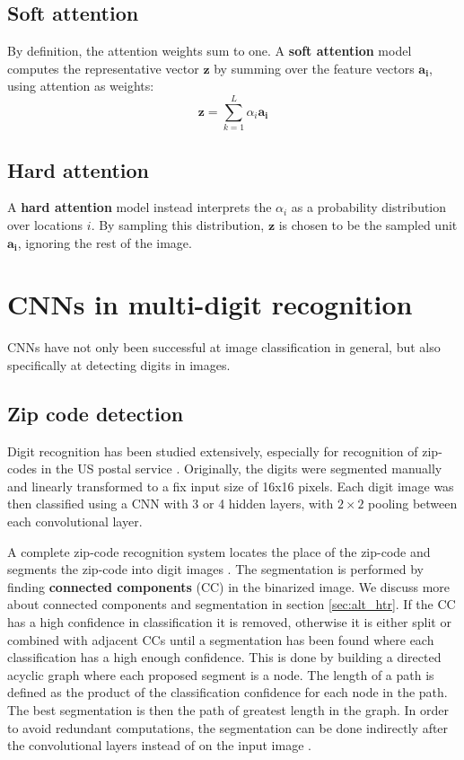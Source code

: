 \subsection{Soft attention} \label{sssec:soft_attention}
By definition, the attention weights sum to one. A \textbf{soft attention} model computes the representative vector $\mathbf{z}$ by summing over the feature vectors $\mathbf{a_i}$, using attention as weights:
\[
\mathbf{z} = \sum_{k=1}^L \alpha_i \mathbf{a_i}
\]

\subsection{Hard attention}
A \textbf{hard attention} model instead interprets the ${\alpha_i}$ as a probability distribution over locations $i$. By sampling this distribution, $\mathbf{z}$ is chosen to be the sampled unit $\mathbf{a_i}$, ignoring the rest of the image.


\section{CNNs in multi-digit recognition}

CNNs have not only been successful at image classification in general, but also specifically at detecting digits in images.

\subsection{Zip code detection}

Digit recognition has been studied extensively, especially for recognition of zip-codes in the US postal service \cite{lecun_1989, lecun_1990}. Originally, the digits were segmented manually and linearly transformed to a fix input size of 16x16 pixels.
Each digit image was then classified using a CNN with 3 or 4 hidden layers, with $2 \times 2$ pooling between each convolutional layer.

A complete zip-code recognition system locates the place of the zip-code and segments the zip-code into digit images \cite{zipcode_system}. The segmentation is performed by finding \textbf{connected components} (CC) in the binarized image. We discuss more about connected components and segmentation in section \ref{sec:alt_htr}.
If the CC has a high confidence in classification it is removed, otherwise it is either split or combined with adjacent CCs until a segmentation has been found where each classification has a high enough confidence. This is done by building a directed acyclic graph where each proposed segment is a node. The length of a path is defined as the product of the classification confidence for each node in the path. The best segmentation is then the path of greatest length in the graph. In order to avoid redundant computations, the segmentation can be done indirectly after the convolutional layers instead of on the input image \cite{lecun_multidigit}.

